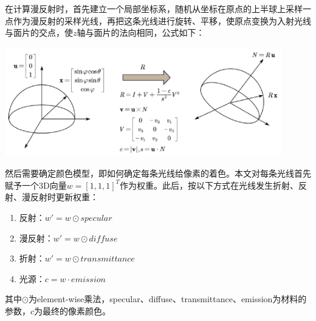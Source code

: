 在计算漫反射时，首先建立一个局部坐标系，随机从坐标在原点的上半球上采样一点作为漫反射的采样光线，再把这条光线进行旋转、平移，使原点变换为入射光线与面片的交点，使$z$轴与面片的法向相同，公式如下：

\begin{center}
\includegraphics[width=12cm]{figure/diffuse.png}
\end{center}

然后需要确定颜色模型，即如何确定每条光线给像素的着色。本文对每条光线首先赋予一个3D向量$w=[1,1,1]^T$作为权重。此后，按以下方式在光线发生折射、反射、漫反射时更新权重：
\begin{enumerate}\label{color-model}
\item 反射：$w'=w\odot specular$
\item 漫反射：$w'=w\odot diffuse$
\item 折射：$w'=w\odot transmittance$
\item 光源：$c=w\cdot emission$
\end{enumerate}
其中$\odot$为element-wise乘法，specular、diffuse、transmittance、emission为材料的参数，$c$为最终的像素颜色。
